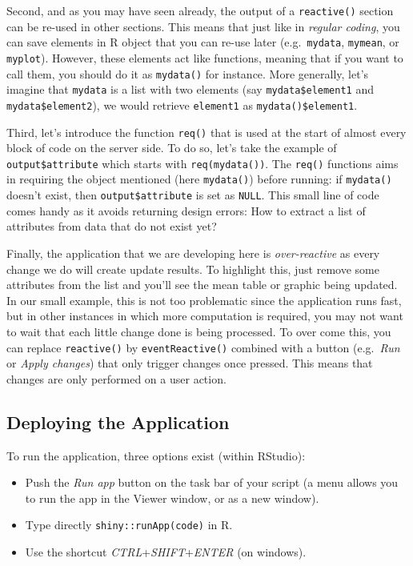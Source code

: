 \documentclass[
]{krantz}
\providecommand{\tightlist}{%
  \setlength{\itemsep}{0pt}\setlength{\parskip}{0pt}}
\begin{document}
Second, and as you may have seen already, the output of a \texttt{reactive()} section can be re-used in other sections. This means that just like in \emph{regular coding}, you can save elements in R object that you can re-use later (e.g.~\texttt{mydata}, \texttt{mymean}, or \texttt{myplot}). However, these elements act like functions, meaning that if you want to call them, you should do it as \texttt{mydata()} for instance. More generally, let's imagine that \texttt{mydata} is a list with two elements (say \texttt{mydata\$element1} and \texttt{mydata\$element2}), we would retrieve \texttt{element1} as \texttt{mydata()\$element1}.

Third, let's introduce the function \texttt{req()} that is used at the start of almost every block of code on the server side. To do so, let's take the example of \texttt{output\$attribute} which starts with \texttt{req(mydata())}. The \texttt{req()} functions aims in requiring the object mentioned (here \texttt{mydata()}) before running: if \texttt{mydata()} doesn't exist, then \texttt{output\$attribute} is set as \texttt{NULL}. This small line of code comes handy as it avoids returning design errors: How to extract a list of attributes from data that do not exist yet?

Finally, the application that we are developing here is \emph{over-reactive} as every change we do will create update results. To highlight this, just remove some attributes from the list and you'll see the mean table or graphic being updated. In our small example, this is not too problematic since the application runs fast, but in other instances in which more computation is required, you may not want to wait that each little change done is being processed. To over come this, you can replace \texttt{reactive()} by \texttt{eventReactive()} combined with a button (e.g.~\emph{Run} or \emph{Apply changes}) that only trigger changes once pressed. This means that changes are only performed on a user action.

\hypertarget{deploying-the-application}{%
\subsection{Deploying the Application}\label{deploying-the-application}}

To run the application, three options exist (within RStudio):

\begin{itemize}
\tightlist
\item
  Push the \emph{Run app} button on the task bar of your script (a menu allows you to run the app in the Viewer window, or as a new window).
\item
  Type directly \texttt{shiny::runApp(\textquotesingle{}code\textquotesingle{})} in R.
\item
  Use the shortcut \emph{CTRL}+\emph{SHIFT}+\emph{ENTER} (on windows).
\end{itemize}
\end{document}
